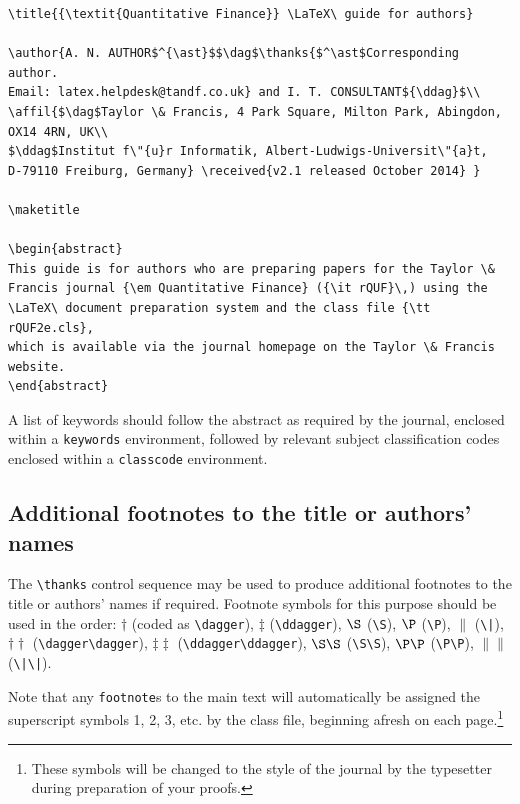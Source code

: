 \documentclass{rQUF2e}
\theoremstyle{plain}
\theoremstyle{definition}
\theoremstyle{remark}
\begin{document}
\begin{verbatim}
\title{{\textit{Quantitative Finance}} \LaTeX\ guide for authors}

\author{A. N. AUTHOR$^{\ast}$$\dag$\thanks{$^\ast$Corresponding author.
Email: latex.helpdesk@tandf.co.uk} and I. T. CONSULTANT${\ddag}$\\
\affil{$\dag$Taylor \& Francis, 4 Park Square, Milton Park, Abingdon,
OX14 4RN, UK\\
$\ddag$Institut f\"{u}r Informatik, Albert-Ludwigs-Universit\"{a}t,
D-79110 Freiburg, Germany} \received{v2.1 released October 2014} }

\maketitle

\begin{abstract}
This guide is for authors who are preparing papers for the Taylor \&
Francis journal {\em Quantitative Finance} ({\it rQUF}\,) using the
\LaTeX\ document preparation system and the class file {\tt rQUF2e.cls},
which is available via the journal homepage on the Taylor \& Francis
website.
\end{abstract}
\end{verbatim}
A list of keywords should follow the abstract as required by the journal, enclosed within a \texttt{keywords} environment, followed by relevant subject classification codes enclosed within a \texttt{classcode} environment.


\subsection{Additional footnotes to the title or authors' names}

The \verb"\thanks" control sequence may be used to produce additional footnotes to the title or authors' names if required.
Footnote symbols for this purpose should be used in the order:
$\dagger$ (coded as \verb"\dagger"), $\ddagger$ (\verb"\ddagger"), $\S$ (\verb"\S"), $\P$ (\verb"\P"), $\|$ (\verb"\|"), $\dagger\dagger$ (\verb"\dagger\dagger"), $\ddagger\ddagger$ (\verb"\ddagger\ddagger"),\break
$\S\S$ (\verb"\S\S"), $\P\P$ (\verb"\P\P"), $\|\|$ (\verb"\|\|").

Note that any \verb"footnote"s to the main text will automatically be assigned the superscript symbols 1, 2, 3, etc. by the class file, beginning afresh on each page.\footnote{These symbols will be changed to the style of the journal by the typesetter during preparation of your proofs.}
\end{document}
